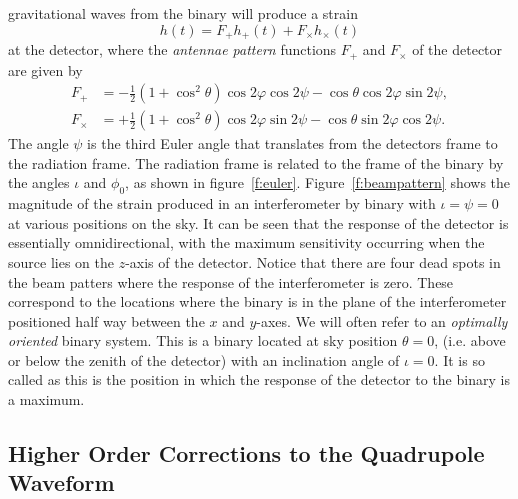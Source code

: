 gravitational waves from the binary will produce a
strain\cite{1987MNRAS.224..131S}
\begin{equation}
h(t) = F_+ h_+(t) + F_\times h_\times(t)
\end{equation}
at the detector, where the \emph{antennae pattern} functions $F_+$ and
$F_\times$ of the detector are given by
\begin{align}
F_+ &= -\frac{1}{2}(1 + \cos^2\theta) \cos 2\varphi \cos 2 \psi - 
\cos\theta \cos 2\varphi \sin 2\psi, \\
F_\times &= +\frac{1}{2}( 1 + \cos^2 \theta) \cos 2\varphi \sin 2\psi -
\cos\theta \sin 2\varphi \cos 2 \psi.
\end{align}
The angle $\psi$ is the third Euler angle that translates from the detectors
frame to the radiation frame. The radiation frame is related to the frame of
the binary by the angles $\iota$ and $\phi_0$, as shown in
figure~\ref{f:euler}. Figure~\ref{f:beampattern} shows the magnitude of the 
strain produced in an interferometer by binary with $\iota = \psi = 0$ at
various positions on the sky. It can be seen that the response of the
detector is essentially omnidirectional, with the maximum sensitivity
occurring when the source lies on the $z$-axis of the detector. Notice that
there are four dead spots in the beam patters where the response of the
interferometer is zero. These correspond to the locations where the binary is
in the plane of the interferometer positioned half way between the $x$ and
$y$-axes. We will often refer to an \emph{optimally oriented} binary system.
This is a binary located at sky position $\theta = 0$, (i.e. above or below
the zenith of the detector) with an inclination angle of $\iota = 0$. It is so
called as this is the position in which the response of the detector to the
binary is a maximum.

\subsection{Higher Order Corrections to the Quadrupole Waveform}

